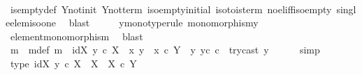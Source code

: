\begin{isabellebody}
\ \ \ \ \isamarkupfalse%
\ is{\isacharunderscore}{\kern0pt}empty{\isacharunderscore}{\kern0pt}def\ Y{\isacharunderscore}{\kern0pt}not{\isacharunderscore}{\kern0pt}init\ Y{\isacharunderscore}{\kern0pt}not{\isacharunderscore}{\kern0pt}term\ iso{\isacharunderscore}{\kern0pt}empty{\isacharunderscore}{\kern0pt}initial\ iso{\isacharunderscore}{\kern0pt}to{}{\isacharunderscore}{\kern0pt}is{\isacharunderscore}{\kern0pt}term\ no{\isacharunderscore}{\kern0pt}el{\isacharunderscore}{\kern0pt}iff{\isacharunderscore}{\kern0pt}iso{\isacharunderscore}{\kern0pt}empty\ single{\isacharunderscore}{\kern0pt}elem{\isacharunderscore}{\kern0pt}iso{\isacharunderscore}{\kern0pt}one\ \isamarkupfalse%
\ blast\isanewline
\ \ \isamarkupfalse%
\ \isamarkupfalse%
\ y{}{\isacharunderscore}{\kern0pt}mono{\isacharbrackleft}{\kern0pt}type{\isacharunderscore}{\kern0pt}rule{\isacharbrackright}{\kern0pt}{\isacharcolon}{\kern0pt}\ {\isachardoublequoteopen}monomorphism{\isacharparenleft}{\kern0pt}y{}{\isacharparenright}{\kern0pt}{\isachardoublequoteclose}\isanewline
\ \ \ \ \isamarkupfalse%
\ element{\isacharunderscore}{\kern0pt}monomorphism\ \isamarkupfalse%
\ blast\isanewline
\ \ \isamarkupfalse%
\ m\ \ m{\isacharunderscore}{\kern0pt}def{\isacharcolon}{\kern0pt}\ {\isachardoublequoteopen}m\ {\isacharequal}{\kern0pt}\ {\isasymlangle}id{\isacharparenleft}{\kern0pt}X{\isacharparenright}{\kern0pt}{\isacharcomma}{\kern0pt}\ y{}\ {\isasymcirc}\isactrlsub c\ {\isasymbeta}\isactrlbsub X\isactrlesub {\isasymrangle}\ {\isasymamalg}\ {\isacharparenleft}{\kern0pt}{\isacharparenleft}{\kern0pt}{\isasymlangle}x{}{\isacharcomma}{\kern0pt}\ y{}{\isasymrangle}\ {\isasymamalg}\ {\isasymlangle}x{}\ {\isasymcirc}\isactrlsub c\ {\isasymbeta}\isactrlbsub Y\ {\isasymsetminus}\ {\isacharparenleft}{\kern0pt}{\isasymone}{\isacharcomma}{\kern0pt}y{}{\isacharparenright}{\kern0pt}\isactrlesub {\isacharcomma}{\kern0pt}\ y{}\isactrlsup c{\isasymrangle}{\isacharparenright}{\kern0pt}\ {\isasymcirc}\isactrlsub c\ \ try{\isacharunderscore}{\kern0pt}cast\ y{}{\isacharparenright}{\kern0pt}{\isachardoublequoteclose}\isanewline
\ \ \ \ \isamarkupfalse%
\ simp\isanewline
\ \ \isamarkupfalse%
\ type{}{\isacharcolon}{\kern0pt}\ {\isachardoublequoteopen}{\isasymlangle}id{\isacharparenleft}{\kern0pt}X{\isacharparenright}{\kern0pt}{\isacharcomma}{\kern0pt}\ y{}\ {\isasymcirc}\isactrlsub c\ {\isasymbeta}\isactrlbsub X\isactrlesub {\isasymrangle}\ {\isacharcolon}{\kern0pt}\ X\ {\isasymrightarrow}\ {\isacharparenleft}{\kern0pt}X\ {\isasymtimes}\isactrlsub c\ Y{\isacharparenright}{\kern0pt}{\isachardoublequoteclose}\isanewline

\end{isabellebody}

